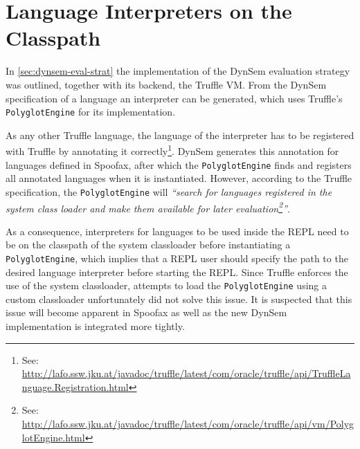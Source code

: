 \section{Language Interpreters on the Classpath}
\label{sec:classpath}

In \cref{sec:dynsem-eval-strat} the implementation of the DynSem evaluation
strategy was outlined, together with its backend, the Truffle VM.  From the
DynSem specification of a language an interpreter can be generated, which uses
Truffle's \texttt{PolyglotEngine} for its implementation.

As any other Truffle language, the language of the interpreter has to be
registered with Truffle by annotating it correctly\footnote{See:
\url{http://lafo.ssw.jku.at/javadoc/truffle/latest/com/oracle/truffle/api/TruffleLanguage.Registration.html}}.
DynSem generates this annotation for languages defined in Spoofax, after which
the \texttt{PolyglotEngine} finds and registers all annotated languages when it
is instantiated. However, according to the Truffle specification, the
\texttt{PolyglotEngine} will \textit{``search for languages registered in the system class
loader and make them available for later evaluation\footnote{See:
\url{http://lafo.ssw.jku.at/javadoc/truffle/latest/com/oracle/truffle/api/vm/PolyglotEngine.html}}''}.

As a consequence, interpreters for languages to be used inside the REPL need to
be on the classpath of the system classloader before instantiating a
\texttt{PolyglotEngine}, which implies that a REPL user should specify the path to
the desired language interpreter before starting the REPL. Since Truffle
enforces the use of the system classloader, attempts to load the
\texttt{PolyglotEngine} using a custom classloader unfortunately did not solve this
issue. It is suspected that this issue will become apparent in Spoofax as well as the new
DynSem implementation is integrated more tightly.

